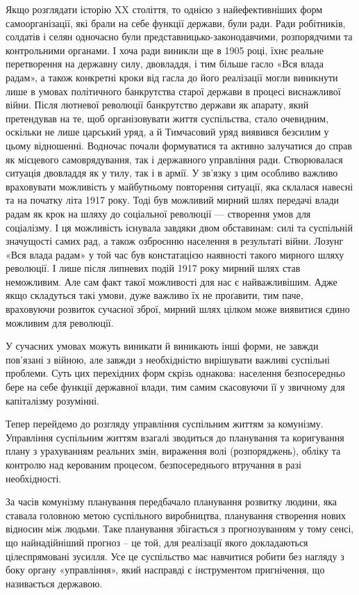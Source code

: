 \documentclass[12pt,a4paper,openany]{book}
\begin{document}
Якщо розглядати історію XX століття, то однією з найефективніших форм самоорганізації, які брали на себе функції держави, були ради. Ради робітників, солдатів і селян одночасно були представницько-законодавчими, розпорядчими та контрольними органами. І хоча ради виникли ще в 1905 році, їхнє реальне перетворення на державну силу, двовладдя, і тим більше гасло «Вся влада радам», а також конкретні кроки від гасла до його реалізації могли виникнути лише в умовах політичного банкрутства старої держави в процесі виснажливої війни. Після лютневої революції банкрутство держави як апарату, який претендував на те, щоб організовувати життя суспільства, стало очевидним, оскільки не лише царський уряд, а й Тимчасовий уряд виявився безсилим у цьому відношенні. Водночас почали формуватися та активно залучатися до справ як місцевого самоврядування, так і державного управління ради. Створювалася ситуація двовладдя як у тилу, так і в армії. У зв’язку з цим особливо важливо враховувати можливість у майбутньому повторення ситуації, яка склалася навесні та на початку літа 1917 року. Тоді був можливий мирний шлях передачі влади радам як крок на шляху до соціальної революції — створення умов для соціалізму. І ця можливість існувала завдяки двом обставинам: силі та суспільній значущості самих рад, а також озброєнню населення в результаті війни. Лозунг «Вся влада радам» у той час був констатацією наявності такого мирного шляху революції. І лише після липневих подій 1917 року мирний шлях став неможливим. Але сам факт такої можливості для нас є найважливішим. Адже якщо складуться такі умови, дуже важливо їх не проґавити, тим паче, враховуючи розвиток сучасної зброї, мирний шлях цілком може виявитися єдино можливим для революції.

У сучасних умовах можуть виникати й виникають інші форми, не завжди пов’язані з війною, але завжди з необхідністю вирішувати важливі суспільні проблеми. Суть цих перехідних форм скрізь однакова: населення безпосередньо бере на себе функції державної влади, тим самим скасовуючи її у звичному для капіталізму розумінні.

Тепер перейдемо до розгляду управління суспільним життям за комунізму. Управління суспільним життям взагалі зводиться до планування та коригування плану з урахуванням реальних змін, вираження волі (розпоряджень), обліку та контролю над керованим процесом, безпосереднього втручання в разі необхідності.

За часів комунізму планування передбачало планування розвитку людини, яка ставала головною метою суспільного виробництва, планування створення нових відносин між людьми. Таке планування збігається з прогнозуванням у тому сенсі, що найнадійніший прогноз – це той, для реалізації якого докладаються цілеспрямовані зусилля. Усе це суспільство має навчитися робити без нагляду з боку органу «управління», який насправді є інструментом пригнічення, що називається державою.
\end{document}
